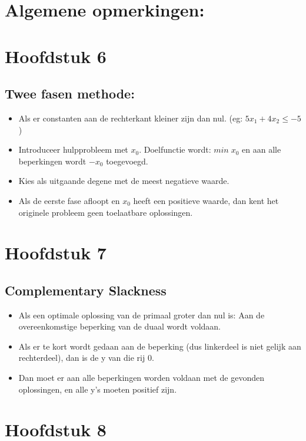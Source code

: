 \documentclass[10pt]{report}
\begin{document}
\titlepage

\chapter{Algemene opmerkingen:}
  

\chapter{Hoofdstuk 6}
  \section{Twee fasen methode:}
    \begin{itemize}
      \item Als er constanten aan de rechterkant kleiner zijn dan nul. (eg: $ 5x_1 + 4x_2 \leq -5$)
      \item Introduceer hulpprobleem met $x_0$. Doelfunctie wordt: $min\; x_0$ en aan alle beperkingen wordt $-x_0$ toegevoegd.
      \item Kies als uitgaande degene met de meest negatieve waarde.
      \item Als de eerste fase afloopt en $x_0$ heeft een positieve waarde, dan kent het originele probleem geen toelaatbare oplossingen.
    \end{itemize}

\chapter{Hoofdstuk 7}
  \section{Complementary Slackness}
    \begin{itemize}
      \item Als een optimale oplossing van de primaal groter dan nul is: Aan de overeenkomstige beperking van de duaal wordt voldaan.
      \item Als er te kort wordt gedaan aan de beperking (dus linkerdeel is niet gelijk aan rechterdeel), dan is de y van die rij 0.
      \item Dan moet er aan alle beperkingen worden voldaan met de gevonden oplossingen, en alle y's moeten positief zijn.
    \end{itemize}


\chapter{Hoofdstuk 8}
\end{document}
